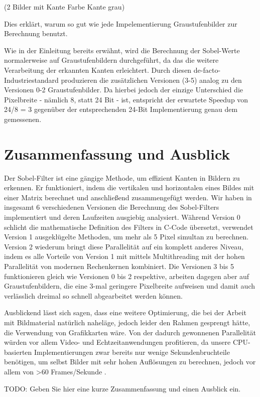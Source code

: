 \documentclass[course=erap]{aspdoc}
\begin{document}
(2 Bilder mit Kante Farbe Kante grau)

Dies erklärt, warum so gut wie jede Impelementierung Graustufenbilder zur Berechnung benutzt.

Wie in der Einleitung bereits erwähnt, wird die Berechnung der Sobel-Werte normalerweise auf Graustufenbildern durchgeführt, da das die weitere Verarbeitung der erkannten Kanten erleichtert.
Durch diesen de-facto-Industriestandard produzieren die zusätzlichen Versionen (3-5) analog zu den Versionen 0-2 Graustufenbilder.
Da hierbei jedoch der einzige Unterschied die Pixelbreite - nämlich 8, statt 24 Bit - ist, entspricht der erwartete Speedup von 24/8 = 3 gegenüber der entsprechenden 24-Bit Implementierung genau dem gemessenen.
\section{Zusammenfassung und Ausblick}
\label{sec:zusammenfassung}
Der Sobel-Filter ist eine gängige Methode, um effizient Kanten in Bildern zu erkennen.
Er funktioniert, indem die vertikalen und horizontalen eines Bildes mit einer Matrix berechnet und anschließend zusammengefügt werden.
Wir haben in insgesamt 6 verschiedenen Versionen die Berechnung des Sobel-Filters implementiert und deren Laufzeiten ausgiebig analysiert.
Während Version 0 schlicht die mathematische Definition des Filters in C-Code übersetzt, verwendet Version 1 ausgeklügelte Methoden, um mehr als 5 Pixel simultan zu berechnen.
Version 2 wiederum bringt diese Parallelität auf ein komplett anderes Niveau, indem es alle Vorteile von Version 1 mit mittels Multithreading mit der hohen Parallelität von modernen Rechenkernen kombiniert.
Die Versionen 3 bis 5 funktionieren gleich wie Versionen 0 bis 2 respektive, arbeiten dagegen aber auf Graustufenbildern, die eine 3-mal geringere Pixelbreite aufweisen und damit auch verlässlich dreimal so schnell abgearbeitet werden können.

Ausblickend lässt sich sagen, dass eine weitere Optimierung, die bei der Arbeit mit Bildmaterial natürlich naheläge, jedoch leider den Rahmen gesprengt hätte, die Verwendung von Grafikkarten wäre.
Von der dadurch gewonnenen Parallelität würden vor allem Video- und Echtzeitanwendungen profitieren, da unsere CPU-basierten Implementierungen zwar bereits nur wenige Sekundenbruchteile benötigen, um selbst Bilder mit sehr hohen Auflösungen zu berechnen, jedoch vor allem von >60 Frames/Sekunde .

TODO: Geben Sie hier eine kurze Zusammenfassung und einen Ausblick ein.


\end{document}

